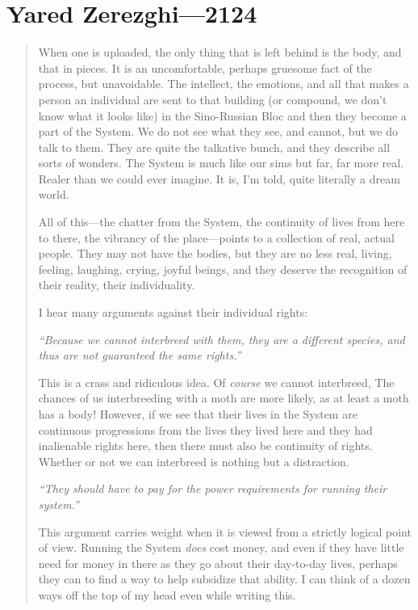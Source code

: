 \hypertarget{yared-zerezghi-2124}{%
\chapter{Yared Zerezghi—2124}\label{yared-zerezghi-2124}}

\begin{quote}
When one is uploaded, the only thing that is left behind is the body, and that in pieces. It is an uncomfortable, perhaps gruesome fact of the process, but unavoidable. The intellect, the emotions, and all that makes a person an individual are sent to that building (or compound, we don't know what it looks like) in the Sino-Russian Bloc and then they become a part of the System. We do not see what they see, and cannot, but we do talk to them. They are quite the talkative bunch, and they describe all sorts of wonders. The System is much like our sims but far, far more real. Realer than we could ever imagine. It is, I'm told, quite literally a dream world.

All of this---the chatter from the System, the continuity of lives from here to there, the vibrancy of the place---points to a collection of real, actual people. They may not have the bodies, but they are no less real, living, feeling, laughing, crying, joyful beings, and they deserve the recognition of their reality, their individuality.

I hear many arguments against their individual rights:\pagebreak

\emph{``Because we cannot interbreed with them, they are a different species, and thus are not guaranteed the same rights.''}

This is a crass and ridiculous idea. Of \emph{course} we cannot interbreed, The chances of us interbreeding with a moth are more likely, as at least a moth has a body! However, if we see that their lives in the System are continuous progressions from the lives they lived here and they had inalienable rights here, then there must also be continuity of rights. Whether or not we can interbreed is nothing but a distraction.

\emph{``They should have to pay for the power requirements for running their system.''}

This argument carries weight when it is viewed from a strictly logical point of view. Running the System \emph{does} cost money, and even if they have little need for money in there as they go about their day-to-day lives, perhaps they can to find a way to help subsidize that ability. I can think of a dozen ways off the top of my head even while writing this.


\end{quote}
